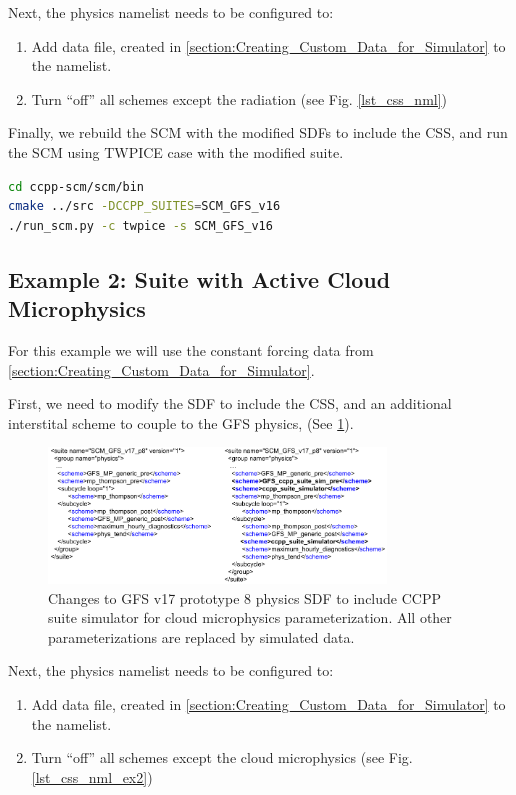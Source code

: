 Next, the physics namelist needs to be configured to:
\begin{enumerate}
\item Add data file,  created in \ref{section:Creating_Custom_Data_for_Simulator} to the namelist.
\item Turn ``off'' all schemes except the radiation (see Fig. \ref{lst_css_nml})
\end{enumerate}

Finally, we rebuild the SCM with the modified SDFs to include the CSS, and run the SCM  using TWPICE case with the modified  suite.
\begin{lstlisting}[language=bash]
cd ccpp-scm/scm/bin
cmake ../src -DCCPP_SUITES=SCM_GFS_v16
./run_scm.py -c twpice -s SCM_GFS_v16
\end{lstlisting}

\subsection{Example 2: Suite with Active Cloud Microphysics}
\label{section:Suite_with_Active_cldmp}

For this example we will use the constant forcing data from \ref{section:Creating_Custom_Data_for_Simulator}.

First, we need to modify the SDF to include the CSS,  and an additional interstital scheme to couple to the GFS physics,  (See \ref{fig:CSS_SDF_ex2}).

\begin{figure}[h]
    \centering
    \includegraphics[width=0.80\textwidth]{images/SDF_changes_for_CSS_ex2.png}
    \caption{Changes to GFS v17 prototype 8  physics SDF to include CCPP suite simulator for  cloud microphysics parameterization. All other parameterizations are replaced by simulated data.}
    \label{fig:CSS_SDF_ex2}
\end{figure}

Next, the physics namelist needs to be configured to:
\begin{enumerate}
\item Add data file,  created in \ref{section:Creating_Custom_Data_for_Simulator} to the namelist.
\item Turn ``off'' all schemes except the cloud microphysics (see Fig. \ref{lst_css_nml_ex2})
\end{enumerate}

